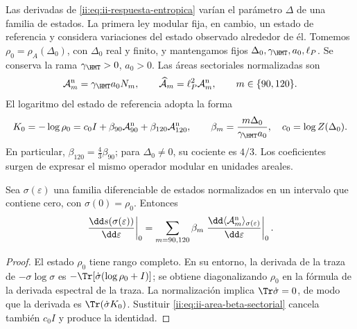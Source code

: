 Las derivadas de \eqref{ii:eq:ii-respuesta-entropica} varían el parámetro
\(\Delta\) de una familia de estados. La primera ley modular fija,
en cambio, un estado de referencia y considera variaciones del estado
observado alrededor de él. Tomemos
\(\rho_0=\rho_A(\Delta_0)\), con \(\Delta_0\) real y finito,
y mantengamos fijos \(\Delta_0,\gamma_{\HMT},a_0,\ell_P\).
Se conserva la rama \(\gamma_{\HMT}>0\), \(a_0>0\).
Las áreas sectoriales normalizadas son
\begin{equation}
 \mathcal A_m^{\rm n}=\gamma_{\HMT}a_0N_m,
 \qquad
 \widehat{\mathcal A}_m=\ell_P^2\mathcal A_m^{\rm n},
 \qquad m\in\{90,120\}.
 \label{ii:eq:ii-area-sector-normalizado}
\end{equation}
El logaritmo del estado de referencia adopta la forma
\begin{equation}
 K_0=-\log\rho_0
 =c_0I+\beta_{90}\mathcal A_{90}^{\rm n}
         +\beta_{120}\mathcal A_{120}^{\rm n},
 \qquad
 \beta_m=\frac{m\Delta_0}{\gamma_{\HMT}a_0},
 \quad c_0=\log Z(\Delta_0).
 \label{ii:eq:ii-area-beta-sectorial}
\end{equation}
En particular, \(\beta_{120}=\tfrac43\beta_{90}\); para
\(\Delta_0\ne0\), su cociente es \(4/3\). Los coeficientes
surgen de expresar el mismo operador modular en unidades areales.

\begin{theorem}
\label{ii:thm:ii-area-primera-ley}
Sea \(\sigma(\varepsilon)\) una familia diferenciable de estados
normalizados en un intervalo que contiene cero, con
\(\sigma(0)=\rho_0\). Entonces
\begin{equation}
 \left.\frac{\dd s(\sigma(\varepsilon))}{\dd\varepsilon}\right|_0
 =\sum_{m=90,120}\beta_m
   \left.\frac{\dd\langle\mathcal A_m^{\rm n}\rangle_
                       {\sigma(\varepsilon)}}{\dd\varepsilon}\right|_0.
 \label{ii:eq:ii-area-primera-ley}
\end{equation}
\end{theorem}
\begin{proof}
El estado \(\rho_0\) tiene rango completo. En su entorno, la derivada
de la traza de \(-\sigma\log\sigma\) es
\(-\Tr[\dot\sigma(\log\rho_0+I)]\); se obtiene diagonalizando
\(\rho_0\) en la fórmula de la derivada espectral de la traza.
La normalización implica \(\Tr\dot\sigma=0\), de modo que la
derivada es \(\Tr(\dot\sigma K_0)\). Sustituir
\eqref{ii:eq:ii-area-beta-sectorial} cancela también \(c_0I\) y
produce la identidad.
\end{proof}


